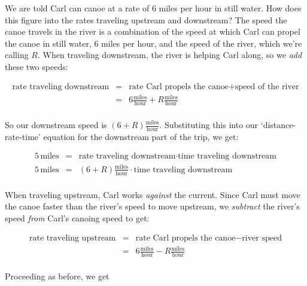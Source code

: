\documentclass{ximera}
\begin{document}
\begin{example}
\begin{explanation}
We are told Carl can canoe at a  rate of $6$ miles per hour in still water.  How does this figure into the rates traveling upstream and downstream?  The speed the canoe travels in the river is a combination of the speed at which Carl can propel the canoe in still water, 6 miles per hour,  and the speed of the river, which we're calling $R$. When traveling downstream, the river is helping Carl along, so we \textit{add} these two speeds: 

\[ \begin{array}{rcl}

\text{rate traveling downstream} & = & \text{rate Carl propels the canoe} + \text{speed of the river} \\

 & = & 6 \frac{\text{miles}}{\text{hour}} + R \frac{\text{miles}}{\text{hour}} \\ \end{array} \]
 
 So our downstream speed is $(6+R) \frac{\text{miles}}{\text{hour}}$.  Substituting this into our `distance-rate-time' equation for the downstream part of the trip, we get:
 
 \[ \begin{array}{rcl}

5 \, \text{miles} & = & \text{rate traveling downstream} \cdot \text{time traveling downstream} \\ 

5 \, \text{miles} & = & (6+R) \frac{\text{miles}}{\text{hour}} \cdot \text{time traveling downstream} \\ 	\end{array} \]

 When traveling upstream, Carl works \textit{against} the current.  Since Carl must move the canoe faster than the river's speed to move upstream,  we \textit{subtract} the river's speed \textit{from} Carl's canoing speed to get:
 
 \[ \begin{array}{rcl}

\text{rate traveling upstream} & = & \text{rate Carl propels the canoe} - \text{river speed} \\

 & = & 6 \frac{\text{miles}}{\text{hour}} - R \frac{\text{miles}}{\text{hour}} \\ \end{array} \]
 
Proceeding as before, we get
 
 \[ \begin{array}{rcl}


\end{array}\]
\end{explanation}
\end{example}
\end{document}

